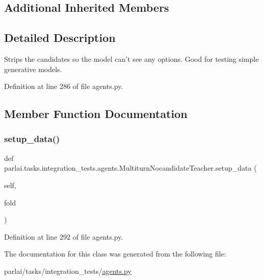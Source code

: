 \subsection*{Additional Inherited Members}


\subsection{Detailed Description}
\begin{DoxyVerb}Strips the candidates so the model can't see any options. Good for testing
simple generative models.
\end{DoxyVerb}
 

Definition at line 286 of file agents.\+py.



\subsection{Member Function Documentation}
\mbox{\label{classparlai_1_1tasks_1_1integration__tests_1_1agents_1_1MultiturnNocandidateTeacher_ac786d0ae36e1d445d68a076b8d1b8391}} 
\subsubsection{\texorpdfstring{setup\+\_\+data()}{setup\_data()}}
{\footnotesize\ttfamily def parlai.\+tasks.\+integration\+\_\+tests.\+agents.\+Multiturn\+Nocandidate\+Teacher.\+setup\+\_\+data (\begin{DoxyParamCaption}\item[{}]{self,  }\item[{}]{fold }\end{DoxyParamCaption})}



Definition at line 292 of file agents.\+py.



The documentation for this class was generated from the following file\+:\begin{DoxyCompactItemize}
\item 
parlai/tasks/integration\+\_\+tests/\hyperlink{parlai_2tasks_2integration__tests_2agents_8py}{agents.\+py}\end{DoxyCompactItemize}
